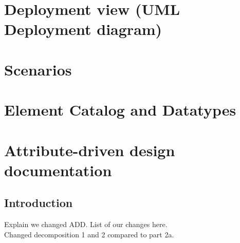 \documentclass[english]{sareport}
\begin{document}
\chapter{Deployment view (UML Deployment diagram)}\label{ch:deployment}
    \minilof
    
    \clearpage

\chapter{Scenarios}\label{ch:scenarios}
    \minilof
    

\chapter{Element Catalog and Datatypes}\label{ch:elements-datatypes}
    

\chapter{Attribute-driven design documentation}\label{sec:add}
    \section{Introduction}
        Explain we changed ADD. List of our changes here. \\
        Changed decomposition 1 and 2 compared to part 2a.

    
    \newpage
    
    \newpage
    
\end{document}
